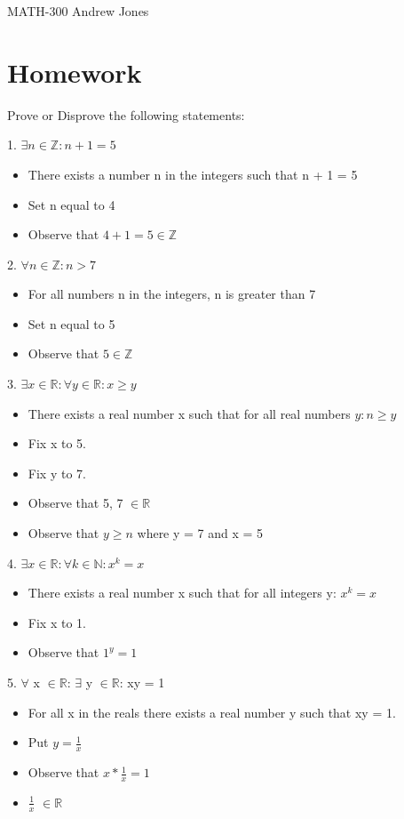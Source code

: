 \documentclass{article}
\begin{document}
  MATH-300 \hfill Andrew Jones
  \centering
  \section{Homework}
  Prove or Disprove the following statements: \newline
  \newline
  \raggedright
  1. $\exists n \in \mathbb{Z}: n + 1 = 5$
  \begin{itemize}
    \item There exists a number n in the integers such that n + 1 = 5
    \item Set n equal to 4
    \item Observe that $4 + 1 = 5 \in \mathbb{Z}$
  \end{itemize}
  2. $\forall n \in \mathbb{Z}: n > 7$
  \begin{itemize}
    \item For all numbers n in the integers, n is greater than 7
    \item Set n equal to 5
    \item Observe that $5 \in \mathbb{Z}$
  \end{itemize}
  3. $\exists x \in \mathbb{R}: \forall y \in \mathbb{R}: x \geq y$
  \begin{itemize}
    \item There exists a real number x such that for all real numbers $y: n \geq y$
    \item Fix x to 5.
    \item Fix y to 7.
    \item Observe that 5, 7 $\in \mathbb{R}$
    \item Observe that $y \ge n $ where y = 7 and x = 5
  \end{itemize}
  4. $\exists x \in \mathbb{R}: \forall k \in \mathbb{N}: x^k = x$ 
  \begin{itemize}
    \item There exists a real number x such that for all integers y: $x^k = x$ 
    \item Fix x to 1.
    \item Observe that $1^y = 1$
  \end{itemize}
  5. \(\forall\) x \(\in \mathbb{R}\): \(\exists\) y \(\in \mathbb{R}\): xy = 1
  \begin{itemize}
    \item For all x in the reals there exists a real number y such that xy = 1.
    \item Put \(y = \frac{1}{x}\)
    \item Observe that \(x * \frac{1}{x} = 1\)
    \item \(\frac{1}{x}\) \(\in \mathbb{R}\)
  \end{itemize}
\end{document}
